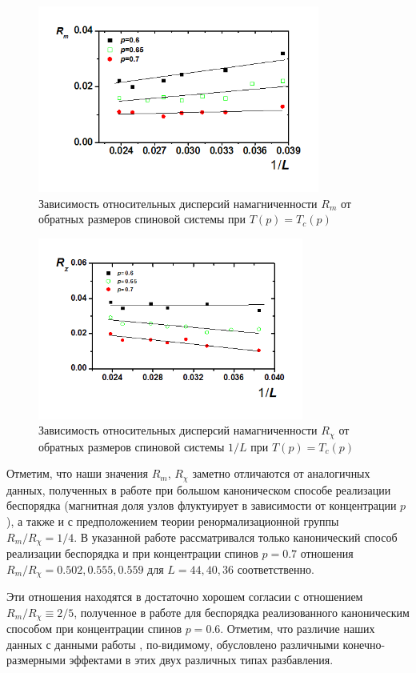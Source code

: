 \begin{figure}[H]
	\centering
	\includegraphics[width=0.5\linewidth]{content/sections/images/phys2-1}
	\caption{Зависимость относительных дисперсий намагниченности $R_m$ от обратных размеров спиновой системы при $T(p)=T_c(p)$}
	\label{phys2-pic-1}
\end{figure}

\begin{figure}[H]
	\centering
	\includegraphics[width=0.5\linewidth]{content/sections/images/phys2-2}
	\caption{Зависимость относительных дисперсий намагниченности $R_{\chi}$ от обратных размеров спиновой системы $1/L$ при $T(p)=T_c(p)$}
	\label{phys2-pic-2}
\end{figure}


Отметим, что наши значения $R_m$, $R_\chi$ заметно отличаются от аналогичных данных, полученных в работе \cite{ph2_4} при большом каноническом способе реализации беспорядка (магнитная доля узлов флуктуирует в зависимости от концентрации $p$), а также и с предположением теории ренормализационной группы  $R_m / R_\chi = 1/4$. В указанной работе рассматривался только канонический способ реализации беспорядка и при концентрации спинов $p=0.7$ отношения $R_m / R_\chi =0.502, 0.555, 0.559$ для $L=44, 40, 36$ соответственно.

Эти отношения находятся в достаточно хорошем согласии с отношением $R_m / R_\chi \equiv 2/5$, полученное в работе \cite{ph2_1} для беспорядка реализованного каноническим способом при концентрации спинов $p=0.6$. Отметим, что различие наших данных с данными работы \cite{ph2_4}, по-видимому, обусловлено различными конечно-размерными эффектами в этих двух различных типах разбавления.


